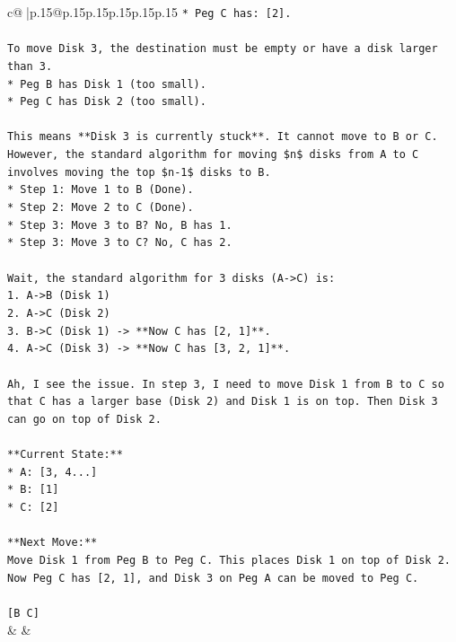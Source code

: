 \documentclass{article}
\begin{document}
{\begin{supertabular}{c@{$\;$}|p{.15\linewidth}@{}p{.15\linewidth}p{.15\linewidth}p{.15\linewidth}p{.15\linewidth}p{.15\linewidth}}
{{{\texttt{*   Peg C has: {[}2{]}.} \\
\\ 
\texttt{To move Disk 3, the destination must be empty or have a disk larger than 3.} \\
\texttt{*   Peg B has Disk 1 (too small).} \\
\texttt{*   Peg C has Disk 2 (too small).} \\
\\ 
\texttt{This means **Disk 3 is currently stuck**. It cannot move to B or C.} \\
\texttt{However, the standard algorithm for moving \$n\$ disks from A to C involves moving the top \$n{-}1\$ disks to B.} \\
\texttt{*   Step 1: Move 1 to B (Done).} \\
\texttt{*   Step 2: Move 2 to C (Done).} \\
\texttt{*   Step 3: Move 3 to B? No, B has 1.} \\
\texttt{*   Step 3: Move 3 to C? No, C has 2.} \\
\\ 
\texttt{Wait, the standard algorithm for 3 disks (A{-}>C) is:} \\
\texttt{1. A{-}>B (Disk 1)} \\
\texttt{2. A{-}>C (Disk 2)} \\
\texttt{3. B{-}>C (Disk 1) {-}> **Now C has {[}2, 1{]}**.} \\
\texttt{4. A{-}>C (Disk 3) {-}> **Now C has {[}3, 2, 1{]}**.} \\
\\ 
\texttt{Ah, I see the issue. In step 3, I need to move Disk 1 from B to C so that C has a larger base (Disk 2) and Disk 1 is on top. Then Disk 3 can go on top of Disk 2.} \\
\\ 
\texttt{**Current State:**} \\
\texttt{*   A: {[}3, 4...{]}} \\
\texttt{*   B: {[}1{]}} \\
\texttt{*   C: {[}2{]}} \\
\\ 
\texttt{**Next Move:**} \\
\texttt{Move Disk 1 from Peg B to Peg C. This places Disk 1 on top of Disk 2. Now Peg C has {[}2, 1{]}, and Disk 3 on Peg A can be moved to Peg C.} \\
\\ 
\texttt{{[}B C{]}} \\
            }
        }
    }
    & & \\ \\


\end{supertabular}}
\end{document}
